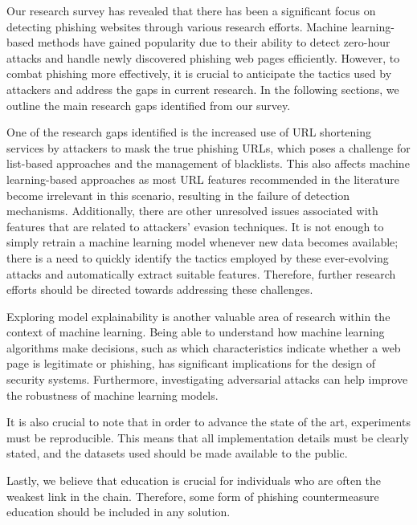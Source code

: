 \documentclass[final]{cvpr}
\begin{document}
Our research survey has revealed that there has been a significant focus on detecting phishing websites through various research efforts. Machine learning-based methods have gained popularity due to their ability to detect zero-hour attacks and handle newly discovered phishing web pages efficiently. However, to combat phishing more effectively, it is crucial to anticipate the tactics used by attackers and address the gaps in current research. In the following sections, we outline the main research gaps identified from our survey.

One of the research gaps identified is the increased use of URL shortening services by attackers to mask the true phishing URLs, which poses a challenge for list-based approaches and the management of blacklists. This also affects machine learning-based approaches as most URL features recommended in the literature become irrelevant in this scenario, resulting in the failure of detection mechanisms. Additionally, there are other unresolved issues associated with features that are related to attackers' evasion techniques. It is not enough to simply retrain a machine learning model whenever new data becomes available; there is a need to quickly identify the tactics employed by these ever-evolving attacks and automatically extract suitable features. Therefore, further research efforts should be directed towards addressing these challenges.

Exploring model explainability is another valuable area of research within the context of machine learning. Being able to understand how machine learning algorithms make decisions, such as which characteristics indicate whether a web page is legitimate or phishing, has significant implications for the design of security systems. Furthermore, investigating adversarial attacks can help improve the robustness of machine learning models.

It is also crucial to note that in order to advance the state of the art, experiments must be reproducible. This means that all implementation details must be clearly stated, and the datasets used should be made available to the public.

Lastly, we believe that education is crucial for individuals who are often the weakest link in the chain. Therefore, some form of phishing countermeasure education should be included in any solution.


{\small


\nocite{*}
}
\end{document}
